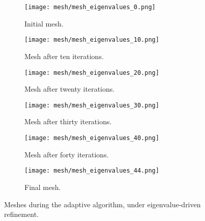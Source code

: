 \begin{figure}[htbp]
    \begin{subfigure}[t]{0.49\textwidth}
        \centering
        \texttt{[image: mesh/mesh\_eigenvalues\_0.png]}
        \caption{Initial mesh.}
        \label{fig:mesh_0}
    \end{subfigure}
    \begin{subfigure}[t]{0.49\textwidth}
        \centering
        \texttt{[image: mesh/mesh\_eigenvalues\_10.png]}
        \caption{Mesh after ten iterations.}
        \label{fig:mesh_10}
    \end{subfigure}
    \vspace{1cm}
    \begin{subfigure}[t]{0.49\textwidth}
        \centering
        \texttt{[image: mesh/mesh\_eigenvalues\_20.png]}
        \caption{Mesh after twenty iterations.}
        \label{fig:mesh_20}
    \end{subfigure}
    \begin{subfigure}[t]{0.49\textwidth}
        \centering
        \texttt{[image: mesh/mesh\_eigenvalues\_30.png]}
        \caption{Mesh after thirty iterations.}
        \label{fig:mesh_30}
    \end{subfigure}
    \vspace{1cm}
    \begin{subfigure}[t]{0.49\textwidth}
        \centering
        \texttt{[image: mesh/mesh\_eigenvalues\_40.png]}
        \caption{Mesh after forty iterations.}
        \label{fig:mesh_40}
    \end{subfigure}
    \begin{subfigure}[t]{0.49\textwidth}
        \centering
        \texttt{[image: mesh/mesh\_eigenvalues\_44.png]}
        \caption{Final mesh.}
        \label{fig:mesh_50}
    \end{subfigure}
    \caption{Meshes during the adaptive algorithm, under eigenvalue-driven refinement.}
\end{figure}


